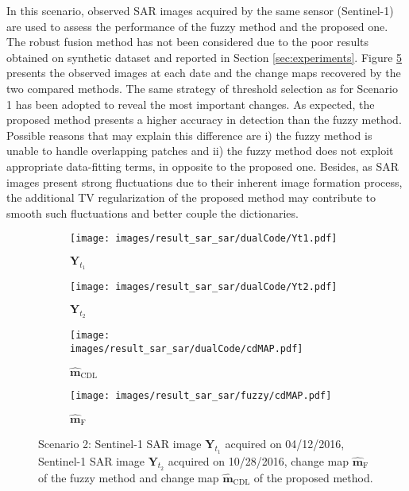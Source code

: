 \documentclass[review]{elsarticle}
\begin{document}
In this scenario, observed SAR images acquired by the same sensor (Sentinel-1) are used to assess the performance of the fuzzy method and the proposed one. The robust fusion method has not been considered due to the poor results obtained on synthetic dataset and reported in Section \ref{sec:experiments}. Figure \ref{fig:realS1S1} presents the observed images at each date and the change maps recovered by the two compared methods. The same strategy of threshold selection as for Scenario 1 has been adopted to reveal the most important changes. As expected, the proposed method presents a higher accuracy in detection than the fuzzy method. Possible reasons that may explain this difference are i) the fuzzy method is unable to handle overlapping patches and ii) the fuzzy method does not exploit appropriate data-fitting terms, in opposite to the proposed one. Besides, as SAR images present strong fluctuations due to their inherent image formation process, the additional TV regularization of the proposed method may contribute to smooth such fluctuations and better couple the dictionaries.

	\begin{figure}[h!]
		\centering
			\begin{subfigure}{\subfwidth}
					\centering	
					\texttt{[image: images/result\_sar\_sar/dualCode/Yt1.pdf]}
					\caption{$\mathbf{Y}_{t_1}$}
					\label{fig:s1s1Yt1}
			\end{subfigure}
			\begin{subfigure}{\subfwidth}
					\centering	
					\texttt{[image: images/result\_sar\_sar/dualCode/Yt2.pdf]}
					\caption{$\mathbf{Y}_{t_2}$}
					\label{fig:s1s1Yt2}
			\end{subfigure}
			\begin{subfigure}{\subfwidth}
					\centering	
					\texttt{[image: images/result\_sar\_sar/dualCode/cdMAP.pdf]}
					\caption{$\hat{\mathbf{m}}_{\mathrm{CDL}}$}
					\label{fig:s1s1DCMAP}
			\end{subfigure}
			\begin{subfigure}{\subfwidth}
					\centering
					\texttt{[image: images/result\_sar\_sar/fuzzy/cdMAP.pdf]}
					\caption{$\hat{\mathbf{m}}_{\mathrm{F}}$}
					\label{fig:s1s1FMAP}
			\end{subfigure}
\caption{Scenario 2: \protect{}  Sentinel-1 SAR image  $\mathbf{Y}_{t_1}$ acquired on 04/12/2016, \protect{}  Sentinel-1 SAR image $\mathbf{Y}_{t_2}$ acquired on 10/28/2016, \protect{} change map $\hat{\mathbf{m}}_{\mathrm{F}}$ of the fuzzy method and \protect{} change map $\hat{\mathbf{m}}_{\mathrm{CDL}}$ of the proposed method.}%
	\label{fig:realS1S1}%
\end{figure}
\end{document}
